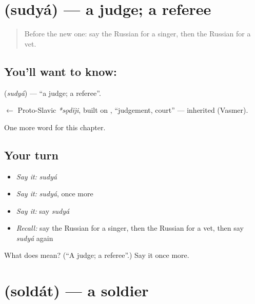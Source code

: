 \section[\texorpdfstring{\ru{судья} (sudyá)}{судья (sudyá)}]{ (sudyá) — a judge; a referee}

\label{lesson:RU-C171-sudya}



\begin{quote}
Before the new one: say the Russian for a singer, then the Russian for a vet.
\end{quote}

\subsection*{You'll want to know: }
\textbf{} (\emph{sudyá}) — \textquotedblleft{}a judge; a referee\textquotedblright{}.

\begin{cousinweb}
\textbf{} $\leftarrow$ Proto-Slavic \emph{*sǫdĭji}, built on \emph{}, \textquotedblleft{}judgement, court\textquotedblright{} — inherited (Vasmer).
\end{cousinweb}

\begin{grammarlens}[title={What you've built}]
One more word for this chapter.
\end{grammarlens}

\subsection*{Your turn}
\begin{itemize}
\raggedright
  \item \emph{Say it:} \emph{sudyá}
  \item \emph{Say it:} \emph{sudyá}, once more
  \item \emph{Say it:} say \emph{sudyá}
  \item \emph{Recall:} say the Russian for a singer, then the Russian for a vet, then say \emph{sudyá} again
\end{itemize}

\begin{tcolorbox}[breakable,colback=teal!4,colframe=teal!35!black,title={Before you move on}]
What does  mean? (\textquotedblleft{}A judge; a referee\textquotedblright{}.) Say it once more.
\end{tcolorbox}
\section[\texorpdfstring{\ru{солдат} (soldát)}{солдат (soldát)}]{ (soldát) — a soldier}

